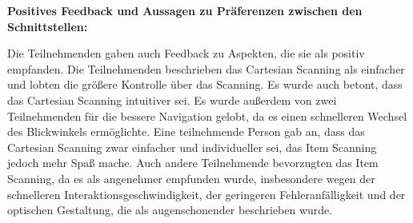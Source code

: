 \textbf{Positives Feedback und Aussagen zu Präferenzen zwischen den Schnittstellen:}

Die Teilnehmenden gaben auch Feedback zu Aspekten, die sie als positiv empfanden. Die Teilnehmenden beschrieben das Cartesian Scanning als einfacher und lobten die größere Kontrolle über das Scanning. Es wurde auch betont, dass das Cartesian Scanning intuitiver sei. Es wurde außerdem von zwei Teilnehmenden für die bessere Navigation gelobt, da es einen schnelleren Wechsel des Blickwinkels ermöglichte. Eine teilnehmende Person gab an, dass das Cartesian Scanning zwar einfacher und individueller sei, das Item Scanning jedoch mehr Spaß mache. Auch andere Teilnehmende bevorzugten das Item Scanning, da es als angenehmer empfunden wurde, insbesondere wegen der schnelleren Interaktionsgeschwindigkeit, der geringeren Fehleranfälligkeit und der optischen Gestaltung, die als augenschonender beschrieben wurde. 


